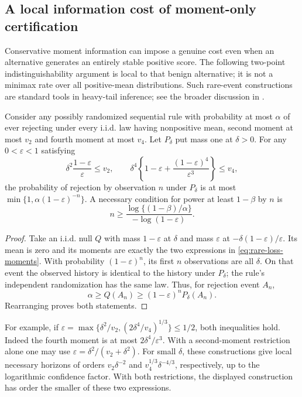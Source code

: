 \subsection{A local information cost of moment-only certification}
Conservative moment information can impose a genuine cost even when an
alternative generates an entirely stable positive score. The following
two-point indistinguishability argument is local to that benign alternative;
it is not a minimax rate over all positive-mean distributions. Such rare-event
constructions are standard tools in heavy-tail inference; see the broader
discussion in \cite{heavysurvey}.

\begin{proposition}
Consider any possibly randomized sequential rule with probability at most
$\alpha$ of ever rejecting under every i.i.d. law having nonpositive mean,
second moment at most $v_2$ and fourth moment at most $v_4$. Let $P_\delta$
put mass one at $\delta>0$. For any $0<\varepsilon<1$ satisfying
\begin{equation}
 \delta^2\frac{1-\varepsilon}{\varepsilon}\le v_2,\qquad
 \delta^4\left\{1-\varepsilon+
              \frac{(1-\varepsilon)^4}{\varepsilon^3}\right\}\le v_4,
 \label{eq:rare-loss-moments}
\end{equation}
the probability of rejection by observation $n$ under $P_\delta$ is at most
$\min\{1,\alpha(1-\varepsilon)^{-n}\}$. A necessary condition for power
at least $1-\beta$ by $n$ is
\begin{equation}
 n\ge\frac{\log\{(1-\beta)/\alpha\}}
                  {-\log(1-\varepsilon)}.\label{eq:rare-loss-horizon}
\end{equation}
\end{proposition}
\begin{proof}
Take an i.i.d. null $Q$ with mass $1-\varepsilon$ at $\delta$ and mass
$\varepsilon$ at $-\delta(1-\varepsilon)/\varepsilon$. Its mean is zero
and its moments are exactly the two expressions in
\eqref{eq:rare-loss-moments}. With probability $(1-\varepsilon)^n$, its
first $n$ observations are all $\delta$. On that event the observed history
is identical to the history under $P_\delta$; the rule's independent
randomization has the same law. Thus, for rejection event $A_n$,
\[
 \alpha\ge Q(A_n)\ge(1-\varepsilon)^nP_\delta(A_n).
\]
Rearranging proves both statements.
\end{proof}

For example, if
$\varepsilon=\max\{\delta^2/v_2,(2\delta^4/v_4)^{1/3}\}\le1/2$,
both inequalities hold. Indeed the fourth moment is at most
$2\delta^4/\varepsilon^3$. With a second-moment restriction alone one may
use $\varepsilon=\delta^2/(v_2+\delta^2)$. For small $\delta$, these
constructions give local necessary horizons of orders
$v_2\delta^{-2}$ and $v_4^{1/3}\delta^{-4/3}$, respectively, up to
the logarithmic confidence factor. With both restrictions, the displayed
construction has order the smaller of these two expressions.

